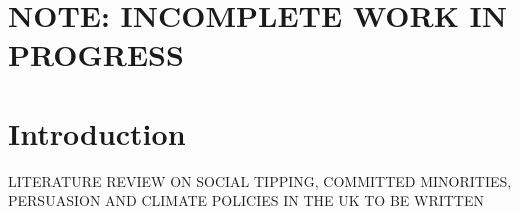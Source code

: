 \documentclass[pdflatex,sn-mathphys-num]{sn-jnl}%
\theoremstyle{thmstyleone}%
\theoremstyle{thmstyletwo}%
\theoremstyle{thmstylethree}%
\begin{document}

\maketitle

\section*{NOTE: INCOMPLETE WORK IN PROGRESS}

\section{Introduction}\label{sec:intro}


LITERATURE REVIEW ON SOCIAL TIPPING, COMMITTED MINORITIES, PERSUASION AND CLIMATE
POLICIES IN THE UK TO BE WRITTEN
\end{document}
